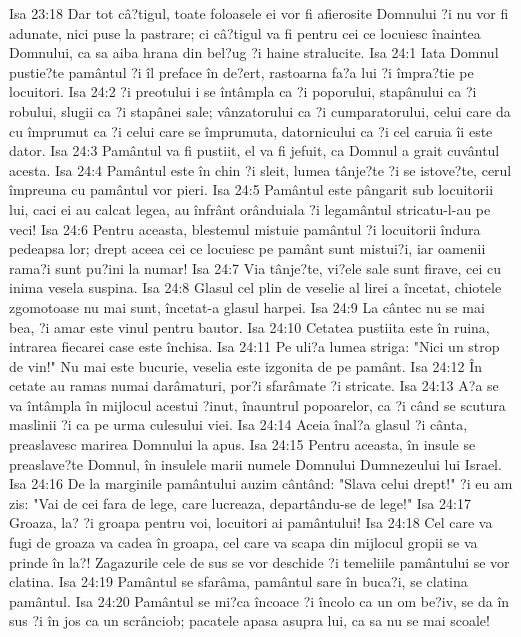 Isa 23:18  Dar tot câ?tigul, toate foloasele ei vor fi afierosite Domnului ?i nu vor fi adunate, nici puse la pastrare; ci câ?tigul va fi pentru cei ce locuiesc înaintea Domnului, ca sa aiba hrana din bel?ug ?i haine stralucite.
Isa 24:1  Iata Domnul pustie?te pamântul ?i îl preface în de?ert, rastoarna fa?a lui ?i împra?tie pe locuitori.
Isa 24:2  ?i preotului i se întâmpla ca ?i poporului, stapânului ca ?i robului, slugii ca ?i stapânei sale; vânzatorului ca ?i cumparatorului, celui care da cu împrumut ca ?i celui care se împrumuta, datornicului ca ?i cel caruia îi este dator.
Isa 24:3  Pamântul va fi pustiit, el va fi jefuit, ca Domnul a grait cuvântul acesta.
Isa 24:4  Pamântul este în chin ?i sleit, lumea tânje?te ?i se istove?te, cerul împreuna cu pamântul vor pieri.
Isa 24:5  Pamântul este pângarit sub locuitorii lui, caci ei au calcat legea, au înfrânt orânduiala ?i legamântul stricatu-l-au pe veci!
Isa 24:6  Pentru aceasta, blestemul mistuie pamântul ?i locuitorii îndura pedeapsa lor; drept aceea cei ce locuiesc pe pamânt sunt mistui?i, iar oamenii rama?i sunt pu?ini la numar!
Isa 24:7  Via tânje?te, vi?ele sale sunt firave, cei cu inima vesela suspina.
Isa 24:8  Glasul cel plin de veselie al lirei a încetat, chiotele zgomotoase nu mai sunt, încetat-a glasul harpei.
Isa 24:9  La cântec nu se mai bea, ?i amar este vinul pentru bautor.
Isa 24:10  Cetatea pustiita este în ruina, intrarea fiecarei case este închisa.
Isa 24:11  Pe uli?a lumea striga: "Nici un strop de vin!" Nu mai este bucurie, veselia este izgonita de pe pamânt.
Isa 24:12  În cetate au ramas numai darâmaturi, por?i sfarâmate ?i stricate.
Isa 24:13  A?a se va întâmpla în mijlocul acestui ?inut, înauntrul popoarelor, ca ?i când se scutura maslinii ?i ca pe urma culesului viei.
Isa 24:14  Aceia înal?a glasul ?i cânta, preaslavesc marirea Domnului la apus.
Isa 24:15  Pentru aceasta, în insule se preaslave?te Domnul, în insulele marii numele Domnului Dumnezeului lui Israel.
Isa 24:16  De la marginile pamântului auzim cântând: "Slava celui drept!" ?i eu am zis: "Vai de cei fara de lege, care lucreaza, departându-se de lege!"
Isa 24:17  Groaza, la? ?i groapa pentru voi, locuitori ai pamântului!
Isa 24:18  Cel care va fugi de groaza va cadea în groapa, cel care va scapa din mijlocul gropii se va prinde în la?! Zagazurile cele de sus se vor deschide ?i temeliile pamântului se vor clatina.
Isa 24:19  Pamântul se sfarâma, pamântul sare în buca?i, se clatina pamântul.
Isa 24:20  Pamântul se mi?ca încoace ?i încolo ca un om be?iv, se da în sus ?i în jos ca un scrânciob; pacatele apasa asupra lui, ca sa nu se mai scoale!
